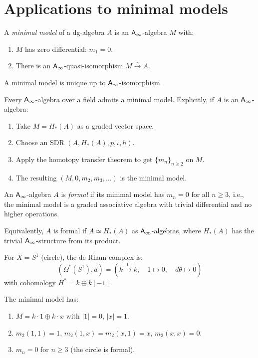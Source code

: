 \section{Applications to minimal models}
\label{sec:minimal-models}

\begin{definition}
\label{def:minimal-model}
A \emph{minimal model} of a dg-algebra $A$ is an $\mathsf{A}_{\infty}$-algebra $M$ with:
\begin{enumerate}[label=(\roman*)]
\item $M$ has zero differential: $m_1 = 0$.
\item There is an $\mathsf{A}_{\infty}$-quasi-isomorphism $M \xrightarrow{\sim} A$.
\end{enumerate}
A minimal model is unique up to $\mathsf{A}_{\infty}$-isomorphism.
\end{definition}

\begin{theorem}
\label{thm:minimal-model-existence}
Every $\mathsf{A}_{\infty}$-algebra over a field admits a minimal model. Explicitly, if 
$A$ is an $\mathsf{A}_{\infty}$-algebra:
\begin{enumerate}[label=(\roman*)]
\item Take $M = H_*(A)$ as a graded vector space.
\item Choose an SDR $(A, H_*(A), p, \iota, h)$.
\item Apply the homotopy transfer theorem to get $\{m_n\}_{n \geq 2}$ on $M$.
\item The resulting $(M, 0, m_2, m_3, \ldots)$ is the minimal model.
\end{enumerate}
\end{theorem}

\begin{corollary}
\label{cor:formality}
An $\mathsf{A}_{\infty}$-algebra $A$ is \emph{formal} if its minimal model has $m_n = 0$
for all $n \geq 3$, i.e., the minimal model is a graded associative
algebra with trivial differential and no higher operations.

Equivalently, $A$ is formal if $A \simeq H_*(A)$ as $\mathsf{A}_{\infty}$-algebras, where 
$H_*(A)$ has the trivial $\mathsf{A}_{\infty}$-structure from its product.
\end{corollary}

\begin{example}
\label{ex:minimal-derham}
For $X = S^1$ (circle), the de Rham complex is:
\[
(\Omega^*(S^1), d) = (k \xrightarrow{0} k, \quad 1 \mapsto 0, \quad d\theta \mapsto 0)
\]
with cohomology $H^* = k \oplus k[-1]$.

The minimal model has:
\begin{enumerate}[label=(\roman*)]
\item $M = k \cdot 1 \oplus k \cdot x$ with $|1| = 0$, $|x| = 1$.
\item $m_2(1, 1) = 1$, $m_2(1, x) = m_2(x, 1) = x$, $m_2(x, x) = 0$.
\item $m_n = 0$ for $n \geq 3$ (the circle is formal).
\end{enumerate}
\end{example}

